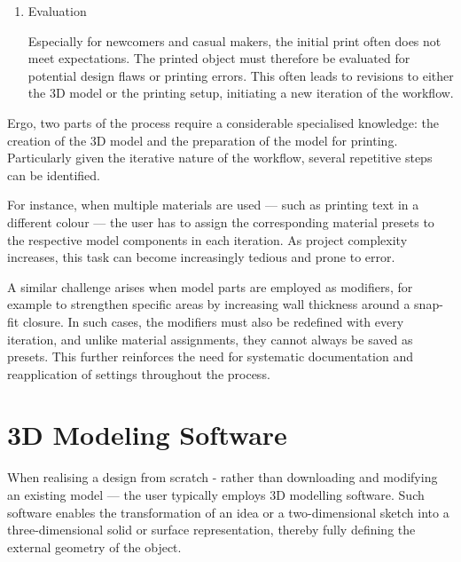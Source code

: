 \begin{enumerate}
    After physically setting up the printer, \ie loading the chosen materials and optionally performing calibrations, the model can be printed using the slicers instructions. 
    \item Evaluation
    
    Especially for newcomers and casual makers, the initial print often does not meet expectations.
    The printed object must therefore be evaluated for potential design flaws or printing errors.
    This often leads to revisions to either the 3D model or the printing setup, initiating a new iteration of the workflow. 
\end{enumerate}

Ergo, two parts of the process require a considerable specialised knowledge: the creation of the 3D model and the preparation of the model for printing.
Particularly given the iterative nature of the workflow, several repetitive steps can be identified.

For instance, when multiple materials are used — such as printing text in a different colour — the user has to assign the corresponding material presets to the respective model components in each iteration.
As project complexity increases, this task can become increasingly tedious and prone to error.

A similar challenge arises when model parts are employed as modifiers, for example to strengthen specific areas by increasing wall thickness around a snap-fit closure.
In such cases, the modifiers must also be redefined with every iteration, and unlike material assignments, they cannot always be saved as presets.
This further reinforces the need for systematic documentation and reapplication of settings throughout the process.

\section{3D Modeling Software}

When realising a design from scratch - rather than downloading and modifying an existing model — the user typically employs 3D modelling software.
Such software enables the transformation of an idea or a two-dimensional sketch into a three-dimensional solid or surface representation, thereby fully defining the external geometry of the object.\cite[p.~4]{gibson_additive_2010}


